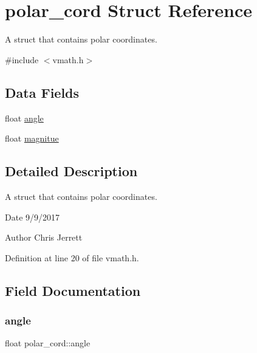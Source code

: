 \hypertarget{structpolar__cord}{}\section{polar\+\_\+cord Struct Reference}
\label{structpolar__cord}


A struct that contains polar coordinates.  




{\ttfamily \#include $<$vmath.\+h$>$}

\subsection*{Data Fields}
\begin{DoxyCompactItemize}
\item 
float \hyperlink{structpolar__cord_a81b3a11d38d76719b02fcd425adaa216}{angle}
\item 
float \hyperlink{structpolar__cord_aec2e25fecc82af176f0fcd23f1e02f0c}{magnitue}
\end{DoxyCompactItemize}


\subsection{Detailed Description}
A struct that contains polar coordinates. 

\begin{DoxyDate}{Date}
9/9/2017 
\end{DoxyDate}
\begin{DoxyAuthor}{Author}
Chris Jerrett 
\end{DoxyAuthor}


Definition at line 20 of file vmath.\+h.



\subsection{Field Documentation}
\mbox{\label{structpolar__cord_a81b3a11d38d76719b02fcd425adaa216}} 
\subsubsection{\texorpdfstring{angle}{angle}}
{\footnotesize\ttfamily float polar\+\_\+cord\+::angle}

